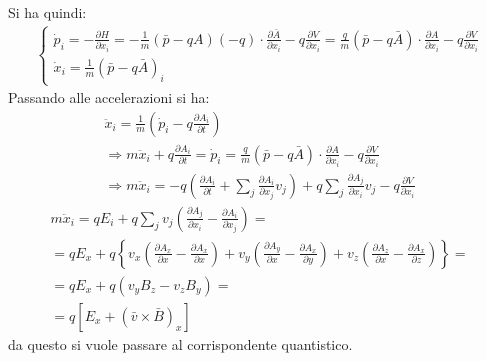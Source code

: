 Si ha quindi:
\begin{equation}\begin{split}
\begin{cases}
\dot p_i=-\frac{\partial H}{\partial x_i}=-\frac{1}{m}\left(\bar p-qA\right)\left(-q\right)\cdot \frac{\partial \bar A}{\partial x_i}-q\frac{\partial V}{\partial x_i}=\frac{q}{m}\left(\bar p- q\bar A\right)\cdot \frac{\partial A}{\partial x_i}-q\frac{\partial V}{\partial x_i} \\
\dot x_i=\frac{1}{m}\left(\bar p-q\bar A\right)_i
\end{cases}
\end{split}\end{equation}
Passando alle accelerazioni si ha:
\begin{equation}\begin{split}
\ddot x_i=\frac{1}{m}\left(\dot p_i-q\frac{\partial A_i}{\partial t}\right) \\
\Longrightarrow m\ddot x_i+q\frac{\partial A_i}{\partial t}=\dot p_i=\frac{q}{m}\left(\bar p- q\bar A\right)\cdot \frac{\partial A}{\partial x_i}-q\frac{\partial V}{\partial x_i} \\
\Longrightarrow m\ddot x_i=-q\left(\frac{\partial A_i}{\partial t}+\sum_j{\frac{\partial A_i}{\partial x_j}v_j}\right)+q\sum_j{\frac{\partial A_j}{\partial x_i}v_j}-q\frac{\partial V}{\partial x_i}
\end{split}\end{equation}
\begin{equation}\begin{split}
m\ddot x_i=qE_i+q\sum_j{v_j\left(\frac{\partial A_j}{\partial x_i}-\frac{\partial A_i}{\partial x_j}\right)}=\\
=qE_x+q\left\{v_x\left(\frac{\partial A_x}{\partial x}-\frac{\partial A_x}{\partial x}\right)+v_y\left(\frac{\partial A_y}{\partial x}-\frac{\partial A_x}{\partial y}\right)+v_z\left(\frac{\partial A_z}{\partial x}-\frac{\partial A_x}{\partial z}\right)\right\}=\\
=qE_x+q\left(v_yB_z-v_zB_y\right)=\\
=q\left[E_x+\left(\bar v\times \bar B\right)_x\right]
\end{split}\end{equation}
da questo si vuole passare al corrispondente quantistico.

